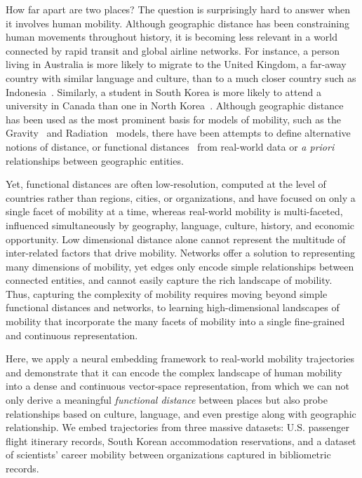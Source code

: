 \documentclass[12pt]{article} %
\begin{document}
How far apart are two places?
The question is surprisingly hard to answer when it involves human mobility.
Although geographic distance has been constraining human movements throughout history, it is becoming less relevant in a world connected by rapid transit and global airline networks.
For instance, a person living in Australia is more likely to migrate to the United Kingdom, a far-away country with similar language and culture, than to a much closer country such as Indonesia~\autocite{pew2018migration}.
Similarly, a student in South Korea is more likely to attend a university in Canada than one in North Korea~\autocite{unesco2019students}.
Although geographic distance has been used as the most prominent basis for models of mobility, such as the Gravity~\autocite{zipf1946gravity} and Radiation~\autocite{simini2012universal} models, there have been attempts to define alternative notions of distance, or functional distances~\autocite{boschma2005proximity, brown1970migration, kim2018functional} from real-world data or \textit{a priori} relationships between geographic entities.

Yet, functional distances are often low-resolution, computed at the level of countries rather than regions, cities, or organizations, and have focused on only a single facet of mobility at a time, whereas real-world mobility is multi-faceted, influenced simultaneously by geography, language, culture, history, and economic opportunity.  
Low dimensional distance alone cannot represent the multitude of inter-related factors that drive mobility. 
Networks offer a solution to representing many dimensions of mobility, yet edges only encode simple relationships between connected entities, and cannot easily capture the rich landscape of mobility. 
Thus, capturing the complexity of mobility requires moving beyond simple functional distances and networks, to learning high-dimensional landscapes of mobility that incorporate the many facets of mobility into a single fine-grained and continuous representation. 
			
Here, we apply a neural embedding framework to real-world mobility trajectories and demonstrate that it can encode the complex landscape of human mobility into a dense and continuous vector-space representation, from which we can not only derive a meaningful \textit{functional distance} between places but also probe relationships based on culture, language, and even prestige along with geographic relationship. 
We embed trajectories from three massive datasets: U.S. passenger flight itinerary records, South Korean accommodation reservations, and a dataset of scientists' career mobility between organizations captured in bibliometric records. 
\end{document}
